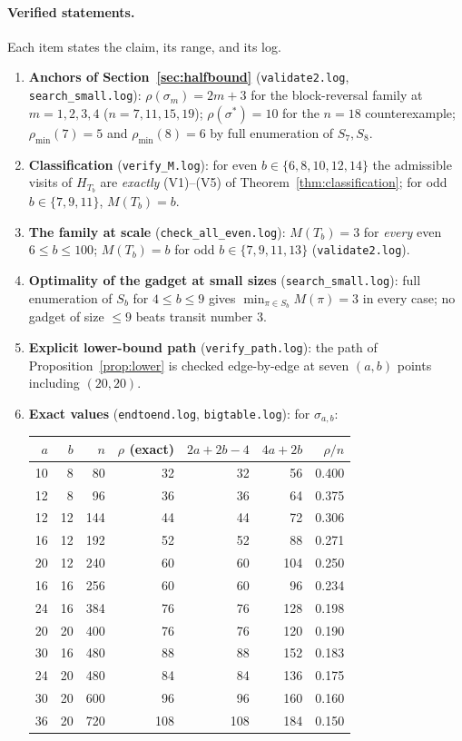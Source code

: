 \documentclass[11pt]{article}
\theoremstyle{definition}
\newcommand{\pmin}{\rho_{\min}}
\begin{document}
\paragraph{Verified statements.} Each item states the claim, its range, and its log.
\begin{enumerate}
\item \textbf{Anchors of Section~\ref{sec:halfbound}} (\texttt{validate2.log},
\texttt{search\_small.log}): $\rho(\sigma_m) = 2m + 3$ for the block-reversal family at
$m = 1, 2, 3, 4$ ($n = 7, 11, 15, 19$); $\rho(\sigma^\ast) = 10$ for the $n = 18$
counterexample; $\pmin(7) = 5$ and $\pmin(8) = 6$ by full enumeration of $S_7, S_8$.
\item \textbf{Classification} (\texttt{verify\_M.log}): for even $b \in \{6, 8, 10, 12,
14\}$ the admissible visits of $H_{T_b}$ are \emph{exactly} (V1)--(V5) of
Theorem~\ref{thm:classification}; for odd $b \in \{7, 9, 11\}$, $M(T_b) = b$.
\item \textbf{The family at scale} (\texttt{check\_all\_even.log}): $M(T_b) = 3$ for
\emph{every} even $6 \le b \le 100$; $M(T_b) = b$ for odd $b \in \{7,9,11,13\}$
(\texttt{validate2.log}).
\item \textbf{Optimality of the gadget at small sizes} (\texttt{search\_small.log}):
full enumeration of $S_b$ for $4 \le b \le 9$ gives $\min_{\pi \in S_b} M(\pi) = 3$ in
every case; no gadget of size $\le 9$ beats transit number $3$.
\item \textbf{Explicit lower-bound path} (\texttt{verify\_path.log}): the path of
Proposition~\ref{prop:lower} is checked edge-by-edge at seven $(a,b)$ points including
$(20,20)$.
\item \textbf{Exact values} (\texttt{endtoend.log}, \texttt{bigtable.log}): for
$\sigma_{a,b}$:

\begin{center}
\begin{tabular}{rrrrrrr}
\toprule
$a$ & $b$ & $n$ & $\rho$ (exact) & $2a{+}2b{-}4$ & $4a{+}2b$ & $\rho/n$ \\
\midrule
10 & 8  & 80  & 32 & 32 & 56  & 0.400 \\
12 & 8  & 96  & 36 & 36 & 64  & 0.375 \\
12 & 12 & 144 & 44 & 44 & 72  & 0.306 \\
16 & 12 & 192 & 52 & 52 & 88  & 0.271 \\
20 & 12 & 240 & 60 & 60 & 104 & 0.250 \\
16 & 16 & 256 & 60 & 60 & 96  & 0.234 \\
24 & 16 & 384 & 76 & 76 & 128 & 0.198 \\
20 & 20 & 400 & 76 & 76 & 120 & 0.190 \\
30 & 16 & 480 & 88 & 88 & 152 & 0.183 \\
24 & 20 & 480 & 84 & 84 & 136 & 0.175 \\
30 & 20 & 600 & 96 & 96 & 160 & 0.160 \\
36 & 20 & 720 & 108 & 108 & 184 & 0.150 \\
\bottomrule
\end{tabular}
\end{center}


\end{enumerate}
\end{document}

